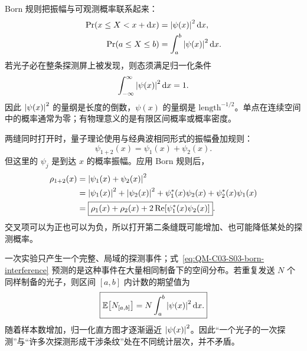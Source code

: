 Born 规则把振幅与可观测概率联系起来：
\begin{align}
  \Pr(x\leq X<x+\mathop{}\!\mathrm{d} x)
  &=\left|\psi(x)\right|^2\mathop{}\!\mathrm{d} x,
  \label{eq:QM-C03-S03-born-infinitesimal}\\
  \Pr(a\leq X\leq b)
  &=\int_a^b\left|\psi(x)\right|^2\mathop{}\!\mathrm{d} x.
  \label{eq:QM-C03-S03-born-interval}
\end{align}
若光子必在整条探测屏上被发现，则态须满足归一化条件
\begin{equation}
  \int_{-\infty}^{\infty}\left|\psi(x)\right|^2\mathop{}\!\mathrm{d} x=1.
  \label{eq:QM-C03-S03-normalization}
\end{equation}
因此 $\left|\psi(x)\right|^2$ 的量纲是长度的倒数，$\psi(x)$ 的量纲是 $\mathrm{length}^{-1/2}$。单点在连续空间中的概率通常为零；有物理意义的是有限区间概率或概率密度。

两缝同时打开时，量子理论使用与经典波相同形式的振幅叠加规则：
\begin{equation}
  \boxed{\psi_{1+2}(x)=\psi_1(x)+\psi_2(x)}.
  \label{eq:QM-C03-S03-amplitude-superposition}
\end{equation}
但这里的 $\psi_j$ 是到达 $x$ 的概率振幅。应用 Born 规则后，
\begin{align}
  \rho_{1+2}(x)
  &=\left|\psi_1(x)+\psi_2(x)\right|^2 \notag\\
  &=\left|\psi_1(x)\right|^2+\left|\psi_2(x)\right|^2
    +\psi_1^*(x)\psi_2(x)+\psi_2^*(x)\psi_1(x) \notag\\
  &=\boxed{\rho_1(x)+\rho_2(x)
    +2\operatorname{Re}\!\left[\psi_1^*(x)\psi_2(x)\right]}.
  \label{eq:QM-C03-S03-born-interference}
\end{align}
交叉项可以为正也可以为负，所以打开第二条缝既可能增加、也可能降低某处的探测概率。

一次实验只产生一个完整、局域的探测事件；式~\eqref{eq:QM-C03-S03-born-interference} 预测的是这种事件在大量相同制备下的空间分布。若重复发送 $N$ 个同样制备的光子，则区间 $[a,b]$ 内计数的期望值为
\begin{equation}
  \boxed{
  \mathbb E\!\left[N_{[a,b]}\right]
  =N\int_a^b\left|\psi(x)\right|^2\mathop{}\!\mathrm{d} x.}
  \label{eq:QM-C03-S03-expected-counts}
\end{equation}
随着样本数增加，归一化直方图才逐渐逼近 $\left|\psi(x)\right|^2$。因此“一个光子的一次探测”与“许多次探测形成干涉条纹”处在不同统计层次，并不矛盾。


